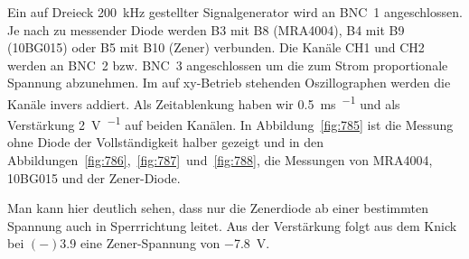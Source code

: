 Ein auf Dreieck \SI{200}{\kilo\hertz} gestellter Signalgenerator wird an BNC~1
angeschlossen. Je nach zu messender Diode werden B3 mit B8 (MRA4004), B4 mit B9
(10BG015) oder B5 mit B10 (Zener) verbunden. Die Kanäle CH1 und CH2 werden an
BNC~2 bzw. BNC~3 angeschlossen um die zum Strom proportionale Spannung
abzunehmen. Im auf xy-Betrieb stehenden Oszillographen werden die Kanäle invers
addiert. Als Zeitablenkung haben wir \SI{0.5}{\milli\second\per\division} und
als Verstärkung \SI{2}{\volt\per\division} auf beiden Kanälen. In
Abbildung~\ref{fig:785} ist die Messung ohne Diode der Vollständigkeit halber
gezeigt und in den
Abbildungen~\ref{fig:786},~\ref{fig:787}~und~\ref{fig:788}, die Messungen
von MRA4004, 10BG015 und der Zener-Diode.

Man kann hier deutlich sehen, dass nur die Zenerdiode ab einer bestimmten Spannung auch in Sperrrichtung leitet. Aus der Verstärkung folgt aus dem Knick bei $(-)$\SI{3.9}{\division} eine Zener-Spannung von \SI{-7.8}{\volt}.

